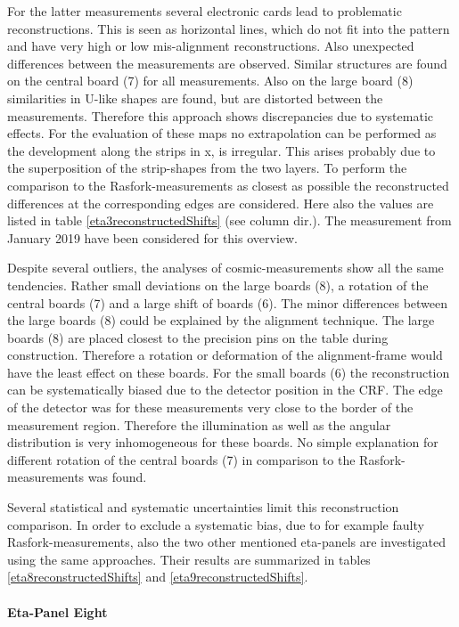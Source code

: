 \documentclass[
twoside,            %
BCOR1.4cm,          %
10pt,               %
headings=normal,    %
headsepline,        %
clearplainpage,		%
final,              %
div=14,
open=right,
bibliography=toc
]{scrreprt}
\begin{document}
For the latter measurements several electronic cards lead to problematic reconstructions. 
This is seen as horizontal lines, which do not fit into the pattern and have very high or low mis-alignment reconstructions.
Also unexpected differences between the measurements are observed.
Similar structures are found on the central board (7) for all measurements.
Also on the large board (8) similarities in U-like shapes are found, but are distorted between the measurements.
Therefore this approach shows discrepancies due to systematic effects.
For the evaluation of these maps no extrapolation can be performed as the development along the strips in x, is irregular.
This arises probably due to the superposition of the strip-shapes from the two layers.
To perform the comparison to the Rasfork-measurements as closest as possible the reconstructed differences at the corresponding edges are considered.
Here also the values are listed in table \ref{eta3reconstructedShifts} (see column dir.).
The measurement from January 2019 have been considered for this overview.

Despite several outliers, the analyses of cosmic-measurements show all the same tendencies.
Rather small deviations on the large boards (8), a rotation of the central boards (7) and a large shift of boards (6).
The minor differences between the large boards (8) could be explained by the alignment technique.
The large boards (8) are placed closest to the precision pins on the table during construction.
Therefore a rotation or deformation of the alignment-frame would have the least effect on these boards.
For the small boards (6) the reconstruction can be systematically biased due to the detector position in the CRF.
The edge of the detector was for these measurements very close to the border of the measurement region.
Therefore the illumination as well as the angular distribution is very inhomogeneous for these boards.
No simple explanation for different rotation of the central boards (7) in comparison to the Rasfork-measurements was found.

Several statistical and systematic uncertainties limit this reconstruction comparison.
In order to exclude a systematic bias, due to for example faulty Rasfork-measurements, also the two other mentioned eta-panels are investigated using the same approaches.
Their results are summarized in tables \ref{eta8reconstructedShifts} and \ref{eta9reconstructedShifts}.

\paragraph{Eta-Panel Eight}
\end{document}
